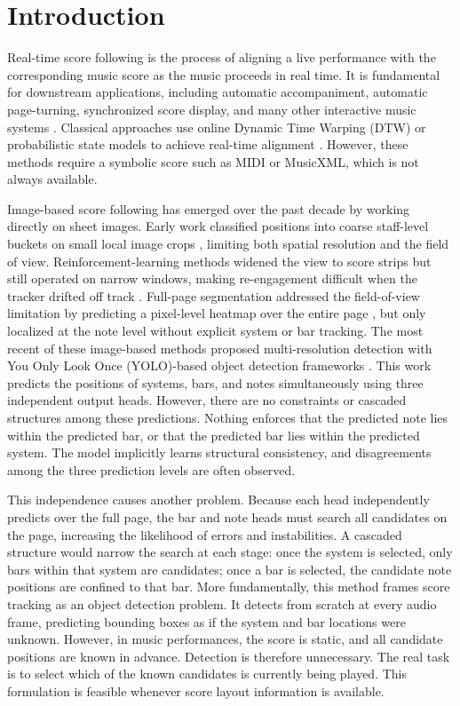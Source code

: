 \section{Introduction}\label{sec:introduction}

Real-time score following is the process of aligning a live performance with the corresponding music score as the music proceeds in real time. It is fundamental for downstream applications, including automatic accompaniment, automatic page-turning, synchronized score display, and many other interactive music systems \cite{orio2003score,dannenberg2006music}. Classical approaches use online Dynamic Time Warping (DTW) or probabilistic state models to achieve real-time alignment \cite{dixon2005line,cont2010coupled,nakamura2016real}. However, these methods require a symbolic score such as MIDI or MusicXML, which is not always available.

Image-based score following has emerged over the past decade by working directly on sheet images. Early work classified positions into coarse staff-level buckets on small local image crops \cite{dorfer2016towards}, limiting both spatial resolution and the field of view. Reinforcement-learning methods widened the view to score strips but still operated on narrow windows, making re-engagement difficult when the tracker drifted off track \cite{dorfer2018rl,henkel2019score}. Full-page segmentation addressed the field-of-view limitation by predicting a pixel-level heatmap over the entire page \cite{henkel2020learning}, but only localized at the note level without explicit system or bar tracking. The most recent of these image-based methods proposed multi-resolution detection with You Only Look Once (YOLO)-based object detection frameworks \cite{henkel2021real}. This work predicts the positions of systems, bars, and notes simultaneously using three independent output heads. However, there are no constraints or cascaded structures among these predictions. Nothing enforces that the predicted note lies within the predicted bar, or that the predicted bar lies within the predicted system. The model implicitly learns structural consistency, and disagreements among the three prediction levels are often observed.

This independence causes another problem. Because each head independently predicts over the full page, the bar and note heads must search all candidates on the page, increasing the likelihood of errors and instabilities. A cascaded structure would narrow the search at each stage: once the system is selected, only bars within that system are candidates; once a bar is selected, the candidate note positions are confined to that bar. More fundamentally, this method frames score tracking as an object detection problem. It detects from scratch at every audio frame, predicting bounding boxes as if the system and bar locations were unknown. However, in music performances, the score is static, and all candidate positions are known in advance. Detection is therefore unnecessary. The real task is to select which of the known candidates is currently being played. This formulation is feasible whenever score layout information is available. 

